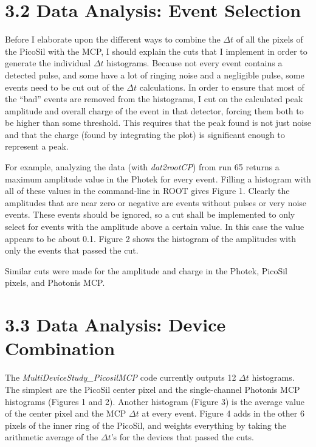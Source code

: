 \documentclass[12pt]{article}
\begin{document}
\section*{3.2 Data Analysis: Event Selection}
Before I elaborate upon the different ways to combine the $\Delta t$ of all the pixels of the PicoSil with the MCP, I should explain the cuts that I implement in order to generate the individual $\Delta t$ histograms. 
Because not every event contains a detected pulse, and some have a lot of ringing noise and a negligible pulse, some events need to be cut out of the $\Delta t$ calculations. 
In order to ensure that most of the “bad” events are removed from the histograms, I cut on the calculated peak amplitude and overall charge of the event in that detector, forcing them both to be higher than some threshold. 
This requires that the peak found is not just noise and that the charge (found by integrating the plot) is significant enough to represent a peak.

For example, analyzing the data (with \textit{dat2rootCP}) from run 65 returns a maximum amplitude value in the Photek for every event. 
Filling a histogram with all of these values in the command-line in ROOT gives Figure 1. 
Clearly the amplitudes that are near zero or negative are events without pulses or very noise events. 
These events should be ignored, so a cut shall be implemented to only select for events with the amplitude above a certain value. 
In this case the value appears to be about 0.1. 
Figure 2 shows the histogram of the amplitudes with only the events that passed the cut.


Similar cuts were made for the amplitude and charge in the Photek, PicoSil pixels, and Photonis MCP. 

\section*{3.3 Data Analysis: Device Combination}
The \textit{MultiDeviceStudy\_PicosilMCP} code currently outputs 12 $\Delta t$ histograms. 
The simplest are the PicoSil center pixel and the single-channel Photonis MCP histograms (Figures 1 and 2). 
Another histogram (Figure 3) is the average value of the center pixel and the MCP $\Delta t$ at every event. 
Figure 4 adds in the other 6 pixels of the inner ring of the PicoSil, and weights everything by taking the arithmetic average of the $\Delta t$’s for the devices that passed the cuts.
\end{document}
